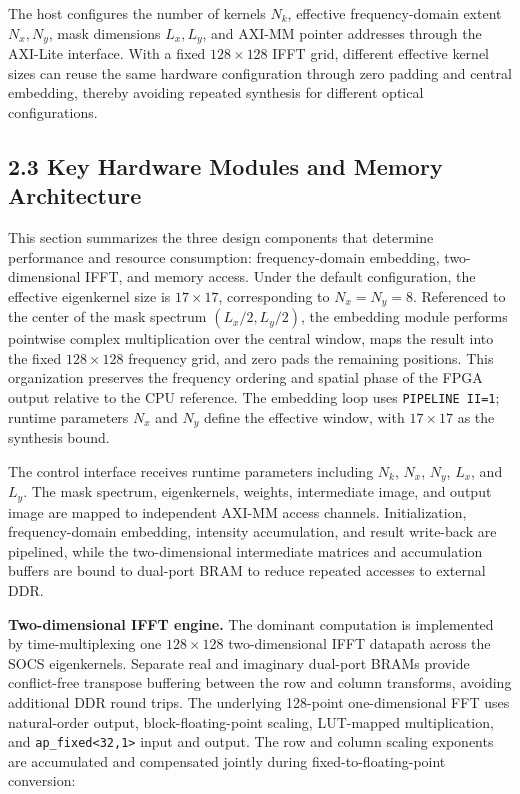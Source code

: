 \documentclass[
  preprint]{elsarticle}
\begin{document}
The host configures the number of kernels \(N_k\), effective
frequency-domain extent \(N_x,N_y\), mask dimensions \(L_x,L_y\), and
AXI-MM pointer addresses through the AXI-Lite interface. With a fixed
\(128 \times 128\) IFFT grid, different effective kernel sizes can reuse
the same hardware configuration through zero padding and central
embedding, thereby avoiding repeated synthesis for different optical
configurations.

\subsection{2.3 Key Hardware Modules and Memory
Architecture}\label{key-hardware-modules-and-memory-architecture}

This section summarizes the three design components that determine
performance and resource consumption: frequency-domain embedding,
two-dimensional IFFT, and memory access. Under the default
configuration, the effective eigenkernel size is \(17 \times 17\),
corresponding to \(N_x=N_y=8\). Referenced to the center of the mask
spectrum \((L_x/2,L_y/2)\), the embedding module performs pointwise
complex multiplication over the central window, maps the result into the
fixed \(128 \times 128\) frequency grid, and zero pads the remaining
positions. This organization preserves the frequency ordering and
spatial phase of the FPGA output relative to the CPU reference. The
embedding loop uses \texttt{PIPELINE\ II=1}; runtime parameters \(N_x\)
and \(N_y\) define the effective window, with \(17 \times 17\) as the
synthesis bound.

The control interface receives runtime parameters including \(N_k\),
\(N_x\), \(N_y\), \(L_x\), and \(L_y\). The mask spectrum, eigenkernels,
weights, intermediate image, and output image are mapped to independent
AXI-MM access channels. Initialization, frequency-domain embedding,
intensity accumulation, and result write-back are pipelined, while the
two-dimensional intermediate matrices and accumulation buffers are bound
to dual-port BRAM to reduce repeated accesses to external DDR.

\textbf{Two-dimensional IFFT engine.} The dominant computation is
implemented by time-multiplexing one \(128 \times 128\) two-dimensional
IFFT datapath across the SOCS eigenkernels. Separate real and imaginary
dual-port BRAMs provide conflict-free transpose buffering between the
row and column transforms, avoiding additional DDR round trips. The
underlying 128-point one-dimensional FFT uses natural-order output,
block-floating-point scaling, LUT-mapped multiplication, and
\texttt{ap\_fixed\textless{}32,1\textgreater{}} input and output. The
row and column scaling exponents are accumulated and compensated jointly
during fixed-to-floating-point conversion:
\end{document}

